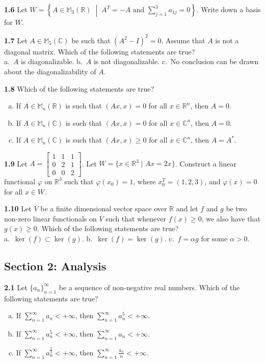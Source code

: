 \documentclass[11pt,a4paper]{article}
\newcommand{\R}{\mathbb{R}}
\newcommand{\C}{\mathbb{C}}
\newcommand{\M}{\mathbb{M}}
\newcommand{\examsec}[1]{%
  \subsection*{#1}
  \vspace{-2pt}
}
\newcommand{\qitem}[1]{\par\medskip\noindent\textbf{#1}\hspace{0.5em}}
\begin{document}
\qitem{1.6} Let $W = \left\{A \in \M_3(\R) \;\middle|\; A^T = -A \text{ and } \sum_{j=1}^{3} a_{1j} = 0\right\}$. Write down a basis for $W$.

\qitem{1.7} Let $A \in \M_5(\C)$ be such that $(A^2 - I)^2 = 0$. Assume that $A$ is not a diagonal matrix. Which of the following statements are true?\\
a.\ $A$ is diagonalizable. \qquad b.\ $A$ is not diagonalizable. \qquad c.\ No conclusion can be drawn about the diagonalizability of $A$.

\qitem{1.8} Which of the following statements are true?
\begin{enumerate}[a.]
  \item If $A \in \M_n(\R)$ is such that $(Ax, x) = 0$ for all $x \in \R^n$, then $A = 0$.
  \item If $A \in \M_n(\C)$ is such that $(Ax, x) = 0$ for all $x \in \C^n$, then $A = 0$.
  \item If $A \in \M_n(\C)$ is such that $(Ax, x) \ge 0$ for all $x \in \C^n$, then $A = A^*$.
\end{enumerate}

\qitem{1.9} Let $A = \begin{bmatrix} 1 & 1 & 1 \\ 0 & 2 & 1 \\ 0 & 0 & 2 \end{bmatrix}$. Let $W = \{x \in \R^3 \mid Ax = 2x\}$. Construct a linear functional $\varphi$ on $\R^3$ such that $\varphi(x_0) = 1$, where $x_0^T = (1, 2, 3)$, and $\varphi(x) = 0$ for all $x \in W$.

\qitem{1.10} Let $V$ be a finite dimensional vector space over $\R$ and let $f$ and $g$ be two non-zero linear functionals on $V$ such that whenever $f(x) \ge 0$, we also have that $g(x) \ge 0$. Which of the following statements are true?\\
a.\ $\ker(f) \subset \ker(g)$. \qquad b.\ $\ker(f) = \ker(g)$. \qquad c.\ $f = \alpha g$ for some $\alpha > 0$.

\examsec{Section 2: Analysis}

\qitem{2.1} Let $\{a_n\}_{n=1}^{\infty}$ be a sequence of non-negative real numbers. Which of the following statements are true?
\begin{enumerate}[a.]
  \item If $\sum_{n=1}^{\infty} a_n < +\infty$, then $\sum_{n=1}^{\infty} a_n^5 < +\infty$.
  \item If $\sum_{n=1}^{\infty} a_n^5 < +\infty$, then $\sum_{n=1}^{\infty} a_n < +\infty$.
  \item If $\sum_{n=1}^{\infty} a_n^{\frac{3}{2}} < +\infty$, then $\sum_{n=1}^{\infty} \frac{a_n}{n} < +\infty$.
\end{enumerate}
\end{document}
